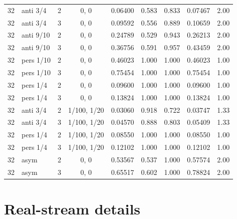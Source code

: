 \documentclass{article}
\theoremstyle{plain}
\theoremstyle{definition}
\theoremstyle{remark}
\begin{document}
\begin{longtable}{rlrcrrrrr}
32 & anti 3/4 & 2 & 0, 0 & 0.06400 & 0.583 & 0.833 & 0.07467 & 2.00\\
32 & anti 3/4 & 3 & 0, 0 & 0.09592 & 0.556 & 0.889 & 0.10659 & 2.00\\
32 & anti 9/10 & 2 & 0, 0 & 0.24789 & 0.529 & 0.943 & 0.26213 & 2.00\\
32 & anti 9/10 & 3 & 0, 0 & 0.36756 & 0.591 & 0.957 & 0.43459 & 2.00\\
32 & pers 1/10 & 2 & 0, 0 & 0.46023 & 1.000 & 1.000 & 0.46023 & 1.00\\
32 & pers 1/10 & 3 & 0, 0 & 0.75454 & 1.000 & 1.000 & 0.75454 & 1.00\\
32 & pers 1/4 & 2 & 0, 0 & 0.09600 & 1.000 & 1.000 & 0.09600 & 1.00\\
32 & pers 1/4 & 3 & 0, 0 & 0.13824 & 1.000 & 1.000 & 0.13824 & 1.00\\
32 & anti 3/4 & 2 & 1/100, 1/20 & 0.03060 & 0.918 & 0.722 & 0.03747 & 1.33\\
32 & anti 3/4 & 3 & 1/100, 1/20 & 0.04570 & 0.888 & 0.803 & 0.05409 & 1.33\\
32 & pers 1/4 & 2 & 1/100, 1/20 & 0.08550 & 1.000 & 1.000 & 0.08550 & 1.00\\
32 & pers 1/4 & 3 & 1/100, 1/20 & 0.12102 & 1.000 & 1.000 & 0.12102 & 1.00\\
32 & asym & 2 & 0, 0 & 0.53567 & 0.537 & 1.000 & 0.57574 & 2.00\\
32 & asym & 3 & 0, 0 & 0.65517 & 0.602 & 1.000 & 0.78824 & 2.00\\
\bottomrule
\end{longtable}

\section{Real-stream details}
\label{app:realdetails}
\end{document}
